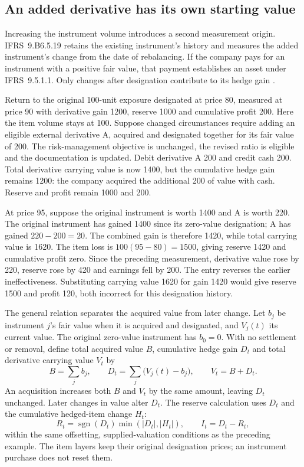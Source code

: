 \subsection{An added derivative has its own starting value}
\label{sec:added-instrument-origins}

Increasing the instrument volume introduces a second measurement origin.
IFRS~9.B6.5.19 retains the existing instrument's history and measures the added
instrument's change from the date of rebalancing. If the company pays for an
instrument with a positive fair value, that payment establishes an asset under
IFRS~9.5.1.1. Only changes after designation contribute to its hedge gain
\citep[IFRS~9, paragraphs 5.1.1 and B6.5.19]{eu20231803}.

Return to the original 100-unit exposure designated at price 80, measured at
price 90 with derivative gain 1200, reserve 1000 and cumulative profit 200.
Here the item volume stays at 100. Suppose changed circumstances require adding
an eligible external derivative A, acquired and designated together for its
fair value of 200. The risk-management objective is unchanged, the revised
ratio is eligible and the documentation is updated. Debit derivative A 200
and credit cash 200. Total derivative carrying value is now 1400, but the
cumulative hedge gain remains 1200: the company acquired the additional 200
of value with cash. Reserve and profit remain 1000 and 200.

At price 95, suppose the original instrument is worth 1400 and A is worth 220.
The original instrument has gained 1400 since its zero-value designation;
A has gained $220-200=20$. The combined gain is therefore 1420, while total
carrying value is 1620. The item loss is $100(95-80)=1500$, giving reserve
1420 and cumulative profit zero. Since the preceding measurement, derivative
value rose by 220, reserve rose by 420 and earnings fell by 200. The entry
reverses the earlier ineffectiveness. Substituting carrying value 1620 for
gain 1420 would give reserve 1500 and profit 120, both incorrect for this
designation history.

The general relation separates the acquired value from later change. Let
$b_j$ be instrument $j$'s fair value when it is acquired and designated, and
$V_j(t)$ its current value. The original zero-value instrument has $b_0=0$.
With no settlement or removal, define total acquired value $B$, cumulative
hedge gain $D_t$ and total derivative carrying value $V_t$ by
\[
 B=\sum_j b_j,\qquad D_t=\sum_j\bigl(V_j(t)-b_j\bigr),
 \qquad V_t=B+D_t.
\]
An acquisition increases both $B$ and $V_t$ by the same amount, leaving $D_t$
unchanged. Later changes in value alter $D_t$. The reserve calculation uses
$D_t$ and the cumulative hedged-item change $H_t$:
\[
 R_t=\operatorname{sgn}(D_t)\min(|D_t|,|H_t|),\qquad I_t=D_t-R_t,
\]
within the same offsetting, supplied-valuation conditions as the preceding
example. The item layers keep their original designation prices; an instrument
purchase does not reset them.

